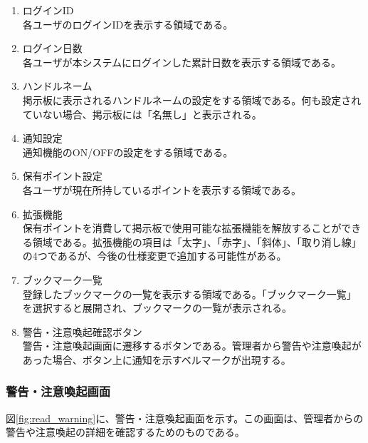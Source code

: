 \documentclass[a4j]{jarticle}
\begin{document}
\begin{enumerate}
  \renewcommand{\labelenumi}{\textcircled{\scriptsize \theenumi}}

  \item ログインID\\
  各ユーザのログインIDを表示する領域である。
  \item ログイン日数\\
  各ユーザが本システムにログインした累計日数を表示する領域である。
  \item ハンドルネーム\\
  掲示板に表示されるハンドルネームの設定をする領域である。何も設定されていない場合、掲示板には「名無し」と表示される。
  \item 通知設定\\
  通知機能のON/OFFの設定をする領域である。
  \item 保有ポイント設定\\
  各ユーザが現在所持しているポイントを表示する領域である。
  \item 拡張機能\\
  保有ポイントを消費して掲示板で使用可能な拡張機能を解放することができる領域である。拡張機能の項目は「太字」、「赤字」、「斜体」、「取り消し線」の4つであるが、今後の仕様変更で追加する可能性がある。
  \item ブックマーク一覧\\
  登録したブックマークの一覧を表示する領域である。「ブックマーク一覧」を選択すると展開され、ブックマークの一覧が表示される。
  \item 警告・注意喚起確認ボタン\\
  警告・注意喚起画面に遷移するボタンである。管理者から警告や注意喚起があった場合、ボタン上に通知を示すベルマークが出現する。
\end{enumerate}

\subsubsection{警告・注意喚起画面}
図\ref{fig:read_warning}に、警告・注意喚起画面を示す。この画面は、管理者からの警告や注意喚起の詳細を確認するためのものである。\\
\end{document}
